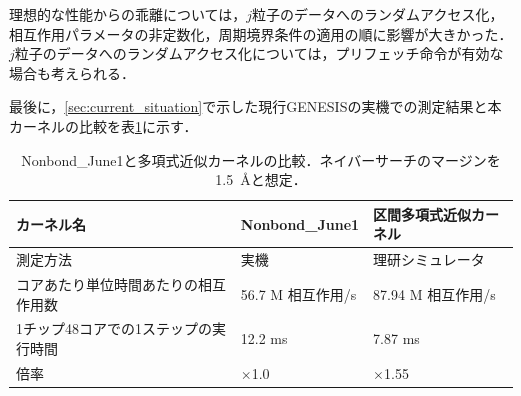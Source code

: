 \documentclass[uplatex,11pt,a4j,titlepage,oneside,openright,dvipdfmx]{jsbook}
\begin{document}
 理想的な性能からの乖離については，$j$粒子のデータへのランダムアクセス化，相互作用パラメータの非定数化，周期境界条件の適用の順に影響が大きかった．$j$粒子のデータへのランダムアクセス化については，プリフェッチ命令が有効な場合も考えられる．


最後に，\ref{sec:current_situation}で示した現行GENESISの実機での測定結果と本カーネルの比較を表\ref{tab:comp}に示す．

 \begin{table}
  \caption{Nonbond\_June1と多項式近似カーネルの比較．ネイバーサーチのマージンを\mbox{1.5 \AA}と想定．}
  \label{tab:comp}
  \begin{tabular}{l||l|l}
   \hline \hline
   カーネル名 & Nonbond\_June1 & 区間多項式近似カーネル \\ \hline
   測定方法 & 実機 & 理研シミュレータ \\
   コアあたり単位時間あたりの相互作用数 & 56.7 M 相互作用/s & 87.94 M 相互作用/s \\
   1チップ48コアでの1ステップの実行時間 & 12.2 ms & 7.87 ms\\ \hline
   倍率 & $\times$1.0 & $\times$1.55 \\
   \hline \hline
  \end{tabular}
 \end{table}
\end{document}
